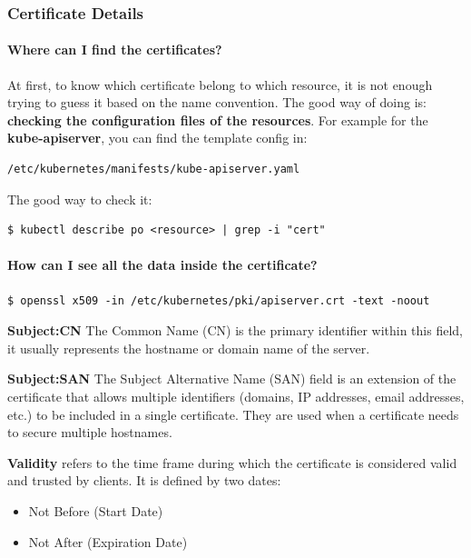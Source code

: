 \documentclass{article}
\newenvironment{codetemplate}[1][]{%
  \mybasecolorbox[#1]
  \itshape
}{%
  \endmybasecolorbox
}
\begin{document}
\subsubsection{Certificate Details}
\paragraph{Where can I find the certificates?}
At first, to know which certificate belong to which resource, it is not enough trying to guess it based on the name convention. The good way of doing is: \textbf{checking the configuration files of the resources}. 
For example for the \textbf{kube-apiserver}, you can find the template config in: 
\begin{codetemplate}{}
\begin{verbatim}
/etc/kubernetes/manifests/kube-apiserver.yaml
\end{verbatim}
\end{codetemplate}

The good way to check it:
\begin{codetemplate}{}
\begin{verbatim}
$ kubectl describe po <resource> | grep -i "cert" 
\end{verbatim}
\end{codetemplate}

\paragraph{How can I see all the data inside the certificate?}
\begin{codetemplate}{}
\begin{verbatim}
$ openssl x509 -in /etc/kubernetes/pki/apiserver.crt -text -noout
\end{verbatim}
\end{codetemplate}

\textbf{Subject:CN} The Common Name (CN) is the primary identifier within this field, it usually represents the hostname or domain name of the server.

\textbf{Subject:SAN} The Subject Alternative Name (SAN) field is an extension of the certificate that allows multiple identifiers (domains, IP addresses, email addresses, etc.) to be included in a single certificate. They are used when a certificate needs to secure multiple hostnames. 

\textbf{Validity}  refers to the time frame during which the certificate is considered valid and trusted by clients. It is defined by two dates:
\begin{itemize}
    \item Not Before (Start Date)
    \item Not After (Expiration Date)
\end{itemize}
\end{document}
